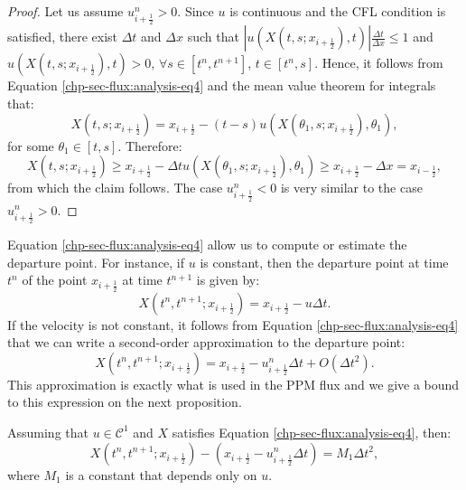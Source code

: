 \begin{proof}
	Let us assume $u_{i+\frac{1}{2}}^n>0$. Since $u$ is continuous and the CFL condition is satisfied,
	there exist $\Delta t$ and $\Delta x$ such that $|u(X(t,s;x_{i+\frac{1}{2}}),t)| \frac{\Delta t}{\Delta x}\leq1$ and $u(X(t,s;x_{i+\frac{1}{2}}),t)>0$, 
	$\forall s \in [t^n, t^{n+1}]$, $t \in [t^n, s]$.
	Hence, it follows from Equation \eqref{chp-sec-flux:analysis-eq4} and the mean value theorem for integrals that:
	\begin{equation*}
		X(t,s;x_{i+\frac{1}{2}}) = x_{i+\frac{1}{2}} - (t-s)u(X(\theta_1,s;x_{i+\frac{1}{2}}),\theta_1),
	\end{equation*}
	for some $\theta_1 \in [t,s]$. Therefore:
	\begin{equation*}
	X(t,s;x_{i+\frac{1}{2}}) \geq x_{i+\frac{1}{2}} - \Delta t u(X(\theta_1,s;x_{i+\frac{1}{2}}),\theta_1)
	\geq x_{i+\frac{1}{2}} - \Delta x = x_{i-\frac{1}{2}},
	\end{equation*}
	from which the claim follows.
	The case $u_{i+\frac{1}{2}}^n<0$  is very similar to the case  $u_{i+\frac{1}{2}}^n>0$.
\end{proof}
Equation \eqref{chp-sec-flux:analysis-eq4} allow us to compute or estimate the departure point.
For instance, if $u$ is constant, then the departure point at time $t^n$ of the point 
$x_{i+\frac{1}{2}}$ at time $t^{n+1}$ is given by:
\begin{equation}
	\label{chp-sec-flux:departurepoint}
	X(t^n,t^{n+1};x_{i+\frac{1}{2}}) = x_{i+\frac{1}{2}} - u\Delta t.
\end{equation}
If the velocity is not constant, it follows from Equation \eqref{chp-sec-flux:analysis-eq4}
that  we can write a second-order approximation to the departure point: 
\begin{equation}
	\label{chp-sec-flux:departurepoint2}
	X(t^n,t^{n+1};x_{i+\frac{1}{2}}) = x_{i+\frac{1}{2}} - u^{n}_{i+\frac{1}{2}}\Delta t + O(\Delta t^2).
\end{equation}
This approximation is exactly what is used in the PPM flux and we give a bound 
to this expression on the next proposition.
\begin{prop}
	Assuming that $u \in \mathcal{C}^1$ and $X$ satisfies Equation \eqref{chp-sec-flux:analysis-eq4}, then:
\begin{equation}
	\label{chp-sec-flux:departurepoint3}
	X(t^n,t^{n+1};x_{i+\frac{1}{2}}) - (x_{i+\frac{1}{2}} - u^{n}_{i+\frac{1}{2}}\Delta t) = M_1 \Delta t^2,
\end{equation}
where $M_1$ is a constant that depends only on $u$. 
\end{prop}
